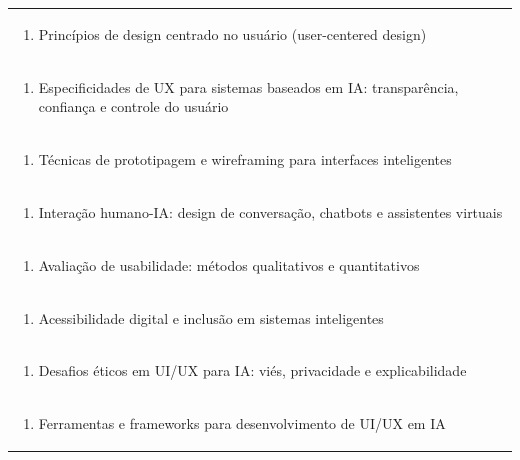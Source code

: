 \documentclass[11pt]{article}
\begin{document}
\begin{center}
\begin{longtable}{|p{4cm}|p{4cm}|p{4cm}|p{4cm}|}
\multicolumn{4}{|p{\dimexpr 16cm + 6\tabcolsep\relax}|}{\begin{enumerate}[start=2]\item Princípios de design centrado no usuário (user-centered design)\end{enumerate}}\\
\multicolumn{4}{|p{\dimexpr 16cm + 6\tabcolsep\relax}|}{\begin{enumerate}[start=3]\item Especificidades de UX para sistemas baseados em IA: transparência, confiança e controle do usuário\end{enumerate}}\\
\multicolumn{4}{|p{\dimexpr 16cm + 6\tabcolsep\relax}|}{\begin{enumerate}[start=4]\item Técnicas de prototipagem e wireframing para interfaces inteligentes\end{enumerate}}\\
\multicolumn{4}{|p{\dimexpr 16cm + 6\tabcolsep\relax}|}{\begin{enumerate}[start=5]\item Interação humano-IA: design de conversação, chatbots e assistentes virtuais\end{enumerate}}\\
\multicolumn{4}{|p{\dimexpr 16cm + 6\tabcolsep\relax}|}{\begin{enumerate}[start=6]\item Avaliação de usabilidade: métodos qualitativos e quantitativos\end{enumerate}}\\
\multicolumn{4}{|p{\dimexpr 16cm + 6\tabcolsep\relax}|}{\begin{enumerate}[start=7]\item Acessibilidade digital e inclusão em sistemas inteligentes\end{enumerate}}\\
\multicolumn{4}{|p{\dimexpr 16cm + 6\tabcolsep\relax}|}{\begin{enumerate}[start=8]\item Desafios éticos em UI/UX para IA: viés, privacidade e explicabilidade\end{enumerate}}\\
\multicolumn{4}{|p{\dimexpr 16cm + 6\tabcolsep\relax}|}{\begin{enumerate}[start=9]\item Ferramentas e frameworks para desenvolvimento de UI/UX em IA\end{enumerate}}\\

\end{longtable}
\end{center}
\end{document}
